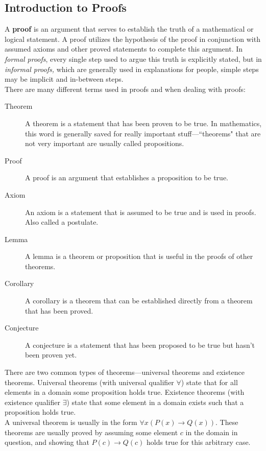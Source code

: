 \documentclass[12pt,letterpaper]{article}
\begin{document}
\subsection{Introduction to Proofs}

A \textbf{proof} is an argument that serves to establish the truth of a mathematical or logical statement. A proof utilizes the hypothesis of the proof in conjunction with assumed axioms and other proved statements to complete this argument. In \textit{formal proofs}, every single step used to argue this truth is explicitly stated, but in \textit{informal proofs,} which are generally used in explanations for people, simple steps may be implicit and in-between steps. \\

There are many different terms used in proofs and when dealing with proofs:

\begin{description}
	\item[Theorem] A theorem is a statement that has been proven to be true. In mathematics, this word is generally saved for really important stuff---``theorems" that are not very important are usually called propositions.
	\item[Proof] A proof is an argument that establishes a proposition to be true.
	\item[Axiom] An axiom is a statement that is assumed to be true and is used in proofs. Also called a postulate.
	\item[Lemma] A lemma is a theorem or proposition that is useful in the proofs of other theorems.
	\item[Corollary] A corollary is a theorem that can be established directly from a theorem that has been proved.
	\item[Conjecture] A conjecture is a statement that has been proposed to be true but hasn't been proven yet.
\end{description}

There are two common types of theorems---universal theorems and existence theorems. Universal theorems (with universal qualifier $\forall$) state that for all elements in a domain some proposition holds true. Existence theorems (with existence qualifier $\exists$) state that some element in a domain exists such that a proposition holds true. \\

A universal theorem is usually in the form $\forall x(P(x) \rightarrow Q(x))$. These theorems are usually proved by assuming some element $c$ in the domain in question, and showing that $P(c) \rightarrow Q(c)$ holds true for this arbitrary case. 
\end{document}
